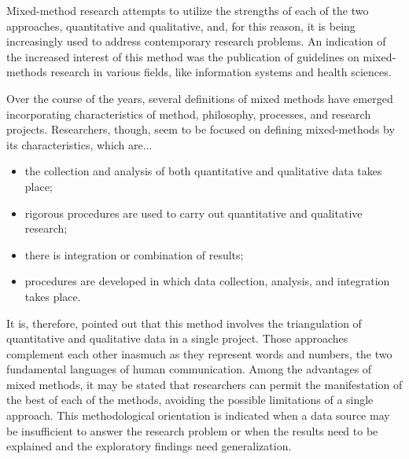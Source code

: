 Mixed-method research attempts to utilize the strengths of each of the two approaches, quantitative and qualitative, and, for this reason, it is being increasingly used to address contemporary research problems. An indication of the increased interest of this method was the publication of guidelines on mixed-methods research in various fields, like information systems\cite{venkatesh2013bridging} and health sciences\cite{creswell2004designing}.

Over the course of the years, several definitions of mixed methods have emerged incorporating characteristics of method, philosophy, processes, and research projects. Researchers, though, seem to be focused on defining mixed-methods by its characteristics, which are...

\begin{itemize}
	
	\item the collection and analysis of both quantitative and qualitative data takes place;

	\item rigorous procedures are used to carry out quantitative and qualitative research;

	\item there is integration or combination of results;

	\item procedures are developed in which data collection, analysis, and integration takes place.

\end{itemize}

It is, therefore, pointed out that this method involves the triangulation of quantitative and qualitative data in a single project. Those approaches complement each other inasmuch as they represent words and numbers, the two fundamental languages of human communication. Among the advantages of mixed methods, it may be stated that researchers can permit the manifestation of the best of each of the methods, avoiding the possible limitations of a single approach. This methodological orientation is indicated when a data source may be insufficient to answer the research problem or when the results need to be explained and the exploratory findings need generalization.

